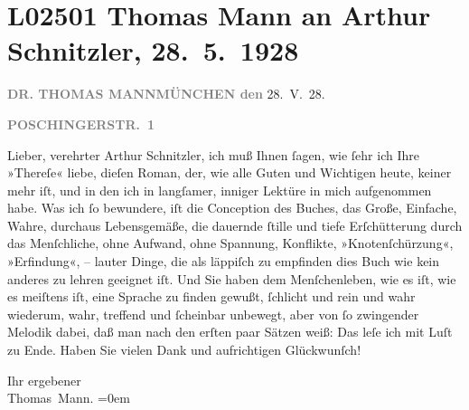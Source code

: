 

\section[Thomas Mann an Arthur Schnitzler, 28. 5. 1928]{L02501 Thomas Mann an Arthur Schnitzler, 28. 5. 1928}
\nopagebreak{}
\rehead{ }\normalsize\beginnumbering{}
\toendnotes[C]{\smallbreak\pagebreak[2]}
\toendnotes[C]{\smallbreak}
\pstart
           {\pb}\textcolor{gray}{\textbf{DR. THOMAS MANN}}\hfill \textcolor{gray}{\textbf{MÜNCHEN den}}{ }28. V. 28.\pend
           
\pstart
           \raggedleft{}\textcolor{gray}{\textbf{POSCHINGERSTR. 1}}\pend
           
\pstart{}Lieber, verehrter Arthur Schnitzler,\pend\vspace{0.5em}
\pstart
           ich muß Ihnen ſagen, wie ſehr ich Ihre »Thereſe«
               liebe, dieſen Roman, der, wie alle Guten und Wichtigen heute, keiner mehr iſt, und in
               den ich in langſamer, inniger Lektüre in mich aufgenommen habe. Was ich ſo bewundere,
               iſt die Conception des Buches, das Große, Einfache, Wahre, durchaus Lebensgemäße, die
               dauernde ſtille und tiefe Erſchütterung durch das {\pb}Menſchliche, ohne Aufwand, ohne Spannung,
               Konflikte, »Knotenſchürzung«, »Erfindung«, – lauter Dinge, die als läppiſch zu
               empfinden dies Buch wie kein
               anderes zu lehren geeignet iſt. Und Sie haben dem Menſchenleben, wie es iſt, wie es
               meiſtens iſt, eine Sprache zu finden gewußt, ſchlicht und rein und wahr wiederum,
               wahr, treffend und ſcheinbar unbewegt, aber von ſo zwingender Melodik dabei, daß man
               nach den erſten paar Sätzen weiß: Das leſe ich mit Luſt zu Ende. Haben Sie vielen
               Dank und aufrichtigen Glückwunſch!\pend
           
\pstart
           Ihr ergebener{\\[\baselineskip]}\spacefill\mbox{Thomas Mann.}\pend
           \leftskip=0em{}\endnumbering{}  
      